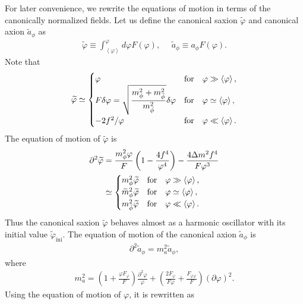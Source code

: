 \documentclass[12pt, a4paper]{article}
\begin{document}
For later convenience, we rewrite the equations of motion in terms of the canonically normalized fields.
Let us define the canonical saxion $\widetilde\varphi$ and canonical axion $\widetilde a_\phi$ as
\begin{align}
	\widetilde\varphi \equiv \int_{\left<\varphi\right>}^\varphi d\varphi F(\varphi),~~~~~~\widetilde a_\phi\equiv a_\phi F(\varphi).
\end{align}
Note that
\begin{align}
	\widetilde\varphi \simeq  \begin{cases}
		\varphi & {\rm for} ~~~\varphi \gg \left<\varphi\right>,\\
		\displaystyle F \delta\varphi =\sqrt{\frac{m_\phi^2+m_{\bar\phi}^2}{m_{\bar\phi}^2}}\delta\varphi & {\rm for} ~~~\varphi \simeq \left<\varphi\right>,\\
		-2f^2/\varphi & {\rm for} ~~~\varphi \ll \left<\varphi\right>.
	\end{cases}
\end{align}
The equation of motion of $\widetilde\varphi$ is
\begin{align}
	\partial^2\widetilde\varphi &
	= \frac{m_\phi^2\varphi}{F} \left(1-\frac{4f^4}{\varphi^4}\right) - \frac{4\Delta m^2 f^4}{F\varphi^3}\\
	&\simeq\begin{cases}
		m_\phi^2 \widetilde\varphi & {\rm for} ~~~\varphi \gg \left<\varphi\right>,\\
		\widetilde m_\phi^2 \widetilde\varphi & {\rm for} ~~~\varphi \simeq \left<\varphi\right>,\\
		m_{\bar\phi}^2 \widetilde\varphi & {\rm for} ~~~\varphi \ll \left<\varphi\right>.
	\end{cases}
\end{align}
Thus the canonical saxion $\widetilde \varphi$ behaves almost as a harmonic oscillator 
with its initial value $\widetilde{\varphi}_\mathrm{ini}$.
The equation of motion of the canonical axion $\widetilde{a}_\phi$ is
\begin{align}
	\partial^2 \widetilde{a}_\phi = m_a^2 \widetilde{a}_\phi,
\end{align}
where
\begin{align}
	m_{a}^2 
	= \left(1+\frac{\varphi F_\varphi}{F}\right)\frac{\partial^2\varphi}{\varphi} 
	+ \left(\frac{2F_\varphi}{F \varphi}+\frac{F_{\varphi\varphi}}{F} \right)(\partial\varphi)^2.
\end{align}
Using the equation of motion of $\varphi$, it is rewritten as
\end{document}
